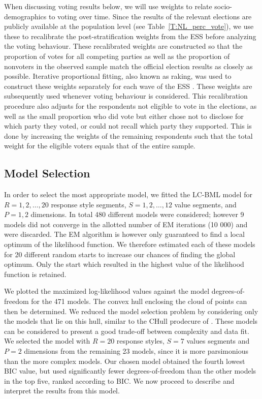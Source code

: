 \documentclass[12pt,letter]{article}\usepackage[]{graphicx}\usepackage[]{xcolor}
\begin{document}
When discussing voting results below, we will use weights to relate socio-demographics to voting over time. Since the results of the relevant elections are publicly available at the population level (see Table~\ref{T:NL_perc_vote}), we use these to recalibrate the post-stratification weights from the ESS before analyzing the voting behaviour. These recalibrated weights are constructed so that the proportion of votes for all competing parties as well as the proportion of nonvoters in the observed sample match the official election results as closely as possible. Iterative proportional fitting, also known as raking, was used to construct these weights separately for each wave of the ESS \citep[see Chapter 8 of][for example]{lohr1999}. These weights are subsequently used whenever voting behaviour is considered. This recalibration procedure also adjusts for the respondents not eligible to vote in the elections, as well as the small proportion who did vote but either chose not to disclose for which party they voted, or could not recall which party they supported. This is done by increasing the weights of the remaining respondents such that the total weight for the eligible voters equals that of the entire sample. 

\subsection*{Model Selection}

In order to select the most appropriate model, we fitted the LC-BML model for $R = 1, 2, \ldots, 20$ response style segments, $S = 1,2,  \ldots, 12$ value segments, and $P = 1, 2$ dimensions. In total 480 different models were considered; however 9 models did not converge in the allotted number of EM iterations (10 000) and were discarded. The EM algorithm is however only guaranteed to find a local optimum of the likelihood function. We therefore estimated each of these models for 20 different random starts to increase our chances of finding the global optimum. Only the start which resulted in the highest value of the likelihood function is retained. 


We plotted the maximized log-likelihood values against the model degrees-of-freedom for the 471 models. The convex hull enclosing the cloud of points can then be determined. We reduced the model selection problem by considering only the models that lie on this hull, similar to the CHull prodecure of \citet{ceulemans2011}. These models can be considered to present a good trade-off between complexity and data fit. We selected the model with $R = 20$ response styles, $S = 7$ values segments and $P = 2$ dimensions from the remaining 23 models, since it is more parsimonious than the more complex models. Our chosen model obtained the fourth lowest BIC value, but used significantly fewer degrees-of-freedom than the other models in the top five, ranked according to BIC. We now proceed to describe and interpret the results from this model.
\end{document}

